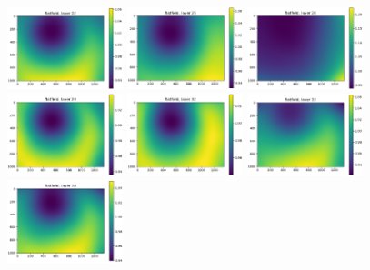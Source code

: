 \documentclass[letterpaper,11pt]{article}
\begin{document}
\begin{figure}[!ht]
\includegraphics[width=0.3\textwidth]{images/methods/flatfield_layers_vectra/flatfield_layer_22}
\includegraphics[width=0.3\textwidth]{images/methods/flatfield_layers_vectra/flatfield_layer_25}
\includegraphics[width=0.3\textwidth]{images/methods/flatfield_layers_vectra/flatfield_layer_26}
\includegraphics[width=0.3\textwidth]{images/methods/flatfield_layers_vectra/flatfield_layer_29}
\includegraphics[width=0.3\textwidth]{images/methods/flatfield_layers_vectra/flatfield_layer_32}
\includegraphics[width=0.3\textwidth]{images/methods/flatfield_layers_vectra/flatfield_layer_33}
\includegraphics[width=0.3\textwidth]{images/methods/flatfield_layers_vectra/flatfield_layer_34}

\end{figure}
\end{document}
